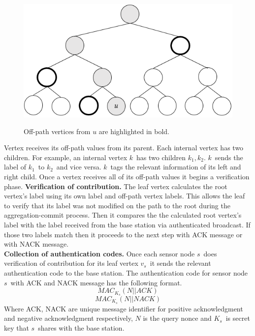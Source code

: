 	\begin{figure}[h!]
		\centering
		\includegraphics[scale = 1]{images/off-path.png}\\
		\caption{Off-path vertices from $u$ are highlighted in bold.}
		\label{fig:commitment-tree-example-2-shia}
	\end{figure}
	Vertex receives its off-path values from its parent.
	Each internal vertex has two children.
	For example, an internal vertex $k$\ has two children $k_{1},k_{2}$.
	$k$\ sends the label of $k_{1}$\ to $k_{2}$\ and vice versa.
	$k$\ tags the relevant information of its left and right child.
	Once a vertex receives all of its off-path values it begins a verification phase.
	\textbf{Verification of contribution.}
	The leaf vertex calculates the root vertex's label using its own label and off-path vertex labels.
	This allows the leaf to verify that its label was not modified on the path to the root during the aggregation-commit process. 
	Then it compares the the calculated root vertex's label with the label received from the base station via authenticated broadcast.
	If those two labels match then it proceeds to the next step with ACK message or with NACK message.\\
	\textbf{Collection of authentication codes.} Once each sensor node $s$\ does verification of contribution for its leaf vertex $v_{s}$\ it sends the relevant authentication code to the base station.
	The authentication code for sensor node $s$\ with ACK and NACK message has the following format.
	\begin{equation}
		MAC_{K_{s}}(N||ACK)	
	\end{equation}
	\begin{equation}
		MAC_{K_{s}}(N||NACK)	
	\end{equation}
	Where ACK, NACK are unique message identifier for positive acknowledgment and negative acknowledgment respectively, $N$ is the query nonce and $K_{s}$\ is secret key that $s$\ shares with the base station.
